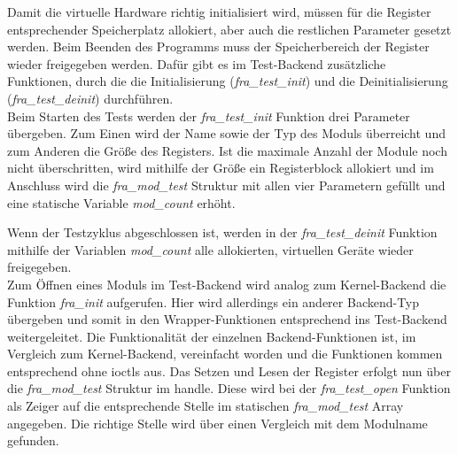 Damit die virtuelle Hardware richtig initialisiert wird, müssen für die Register entsprechender Speicherplatz allokiert, aber auch die restlichen Parameter gesetzt werden. Beim Beenden des Programms muss der Speicherbereich der Register wieder freigegeben werden. Dafür gibt es im Test-Backend zusätzliche Funktionen, durch die die Initialisierung (\textit{fra\_test\_init}) und die Deinitialisierung (\textit{fra\_test\_deinit}) durchführen.\\

 
Beim Starten des Tests werden der \textit{fra\_test\_init} Funktion drei Parameter übergeben. Zum Einen wird der Name sowie der Typ des Moduls überreicht und zum Anderen die Größe des Registers. Ist die maximale Anzahl der Module noch nicht überschritten, wird mithilfe der Größe ein Registerblock allokiert und im Anschluss wird die \textit{fra\_mod\_test} Struktur mit allen vier Parametern gefüllt und eine statische Variable \textit{mod\_count} erhöht.

Wenn der Testzyklus abgeschlossen ist, werden in der \textit{fra\_test\_deinit} Funktion mithilfe der Variablen \textit{mod\_count} alle allokierten, virtuellen Geräte wieder freigegeben.\\


Zum Öffnen eines Moduls im Test-Backend wird analog zum Kernel-Backend die Funktion \textit{fra\_init} aufgerufen. Hier wird allerdings ein anderer Backend-Typ übergeben und somit in den Wrapper-Funktionen entsprechend ins Test-Backend weitergeleitet. 
Die Funktionalität der einzelnen Backend-Funktionen ist, im Vergleich zum Kernel-Backend, vereinfacht worden und die Funktionen kommen entsprechend ohne \ac{ioctl}s aus. Das Setzen und Lesen der Register erfolgt nun über die \textit{fra\_mod\_test} Struktur im \gls{handle}. Diese wird bei der \textit{fra\_test\_open} Funktion als Zeiger auf die entsprechende Stelle im statischen \textit{fra\_mod\_test} Array angegeben. Die richtige Stelle wird über einen Vergleich mit dem Modulname gefunden.\\



